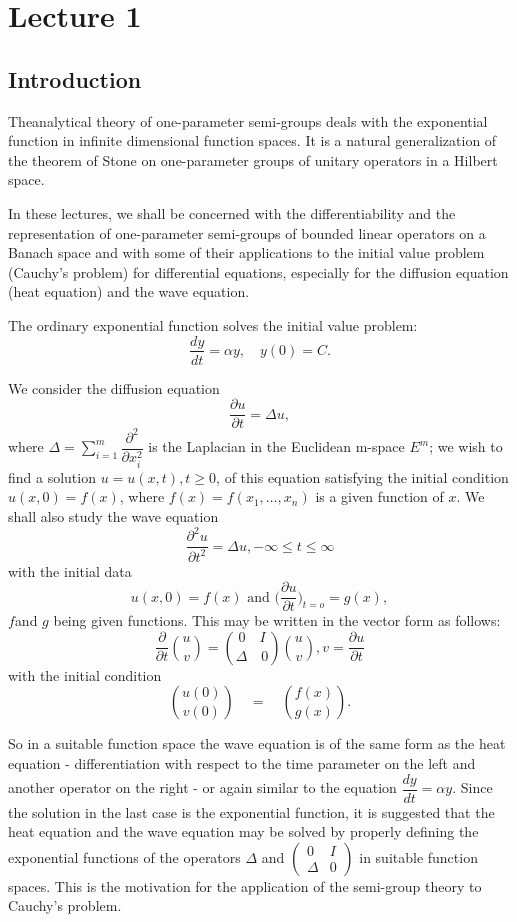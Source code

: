 \chapter{Lecture 1}\label{chap1}

\section{Introduction}\label{chap1:sec1}

The\pageoriginale analytical theory of one-parameter semi-groups deals with the
exponential function in infinite dimensional function spaces. It is a
natural generalization of the theorem of Stone on one-parameter groups
of unitary operators in a Hilbert space. 

In these lectures, we shall be concerned with the differentiability
and the representation of one-parameter semi-groups of bounded linear
operators on a Banach space and with some of their applications to the
initial value problem (Cauchy's problem) for differential equations,
especially for the diffusion equation (heat equation) and the wave
equation. 

The ordinary exponential function solves the initial value problem:
$$ 
\frac{dy}{dt} = \alpha y, \quad y (0) = C.
$$

We consider the diffusion equation
$$
\frac{\partial u}{\partial t} = \Delta u,
$$
where $\Delta = \sum\limits_{i = 1}^m \dfrac{\partial^2}{\partial
 x^2_i}$ is the Laplacian in the Euclidean m-space $E^m$; we wish to
find a solution $u = u(x, t), t \ge 0$, of this equation satisfying
the initial condition $u(x, 0) = f(x)$, where $f(x) = f(x_1, \ldots,
x_n)$ is a given function of $x$. We shall also study the wave
equation 
$$
\frac{\partial^2 u}{\partial t^2} = \Delta u, - \infty \le t \le \infty
$$
with the initial data 
$$
u (x, 0) = f(x) \text { and } \big( \frac{\partial u}{\partial t}
\big)_{t = o} = g (x), 
$$
$f$\pageoriginale and $g$ being given functions. This may be written in the vector
form as follows: 
$$
\frac{\partial}{\partial t} \binom{u}{v} = 
\binom{0 \quad I}{\Delta \quad 0} 
\binom{u}{v}, v = \frac{\partial u}{\partial t} 
$$
with the initial condition 
$$
\binom {u(0)}{v(0)} \quad = \quad \binom{f(x)}{g(x)}. 
$$

So in a suitable function space the wave equation is of the same form
as the heat equation - differentiation with respect to the time
parameter on the left and another operator on the right - or again
similar to the equation $\dfrac{d y}{d t} = \alpha y$. Since the
solution in the last case is the exponential function, it is suggested
that the heat equation and the wave equation may be solved by properly
defining the exponential functions of the operators $\Delta$ and
$\begin{pmatrix} 0 & I \\ \Delta & 0 \end{pmatrix}$ in suitable
function spaces. This is the motivation for the application of the
semi-group theory to Cauchy's problem. 


